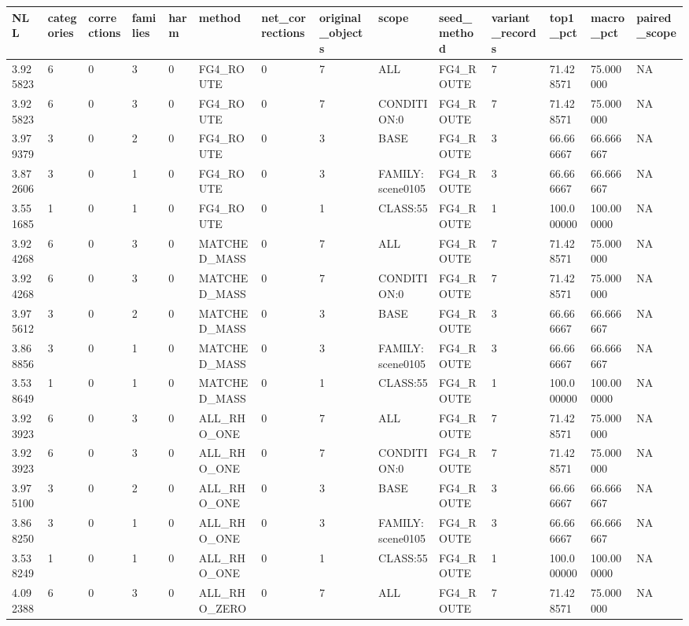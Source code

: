 \begin{tabular}{llllllllllllll}
\toprule
NLL & categories & corrections & families & harm & method & net\_corrections & original\_objects & scope & seed\_method & variant\_records & top1\_pct & macro\_pct & paired\_scope \\
\midrule
3.925823 & 6 & 0 & 3 & 0 & FG4\_ROUTE & 0 & 7 & ALL & FG4\_ROUTE & 7 & 71.428571 & 75.000000 & NA \\
3.925823 & 6 & 0 & 3 & 0 & FG4\_ROUTE & 0 & 7 & CONDITION:0 & FG4\_ROUTE & 7 & 71.428571 & 75.000000 & NA \\
3.979379 & 3 & 0 & 2 & 0 & FG4\_ROUTE & 0 & 3 & BASE & FG4\_ROUTE & 3 & 66.666667 & 66.666667 & NA \\
3.872606 & 3 & 0 & 1 & 0 & FG4\_ROUTE & 0 & 3 & FAMILY:scene0105 & FG4\_ROUTE & 3 & 66.666667 & 66.666667 & NA \\
3.551685 & 1 & 0 & 1 & 0 & FG4\_ROUTE & 0 & 1 & CLASS:55 & FG4\_ROUTE & 1 & 100.000000 & 100.000000 & NA \\
3.924268 & 6 & 0 & 3 & 0 & MATCHED\_MASS & 0 & 7 & ALL & FG4\_ROUTE & 7 & 71.428571 & 75.000000 & NA \\
3.924268 & 6 & 0 & 3 & 0 & MATCHED\_MASS & 0 & 7 & CONDITION:0 & FG4\_ROUTE & 7 & 71.428571 & 75.000000 & NA \\
3.975612 & 3 & 0 & 2 & 0 & MATCHED\_MASS & 0 & 3 & BASE & FG4\_ROUTE & 3 & 66.666667 & 66.666667 & NA \\
3.868856 & 3 & 0 & 1 & 0 & MATCHED\_MASS & 0 & 3 & FAMILY:scene0105 & FG4\_ROUTE & 3 & 66.666667 & 66.666667 & NA \\
3.538649 & 1 & 0 & 1 & 0 & MATCHED\_MASS & 0 & 1 & CLASS:55 & FG4\_ROUTE & 1 & 100.000000 & 100.000000 & NA \\
3.923923 & 6 & 0 & 3 & 0 & ALL\_RHO\_ONE & 0 & 7 & ALL & FG4\_ROUTE & 7 & 71.428571 & 75.000000 & NA \\
3.923923 & 6 & 0 & 3 & 0 & ALL\_RHO\_ONE & 0 & 7 & CONDITION:0 & FG4\_ROUTE & 7 & 71.428571 & 75.000000 & NA \\
3.975100 & 3 & 0 & 2 & 0 & ALL\_RHO\_ONE & 0 & 3 & BASE & FG4\_ROUTE & 3 & 66.666667 & 66.666667 & NA \\
3.868250 & 3 & 0 & 1 & 0 & ALL\_RHO\_ONE & 0 & 3 & FAMILY:scene0105 & FG4\_ROUTE & 3 & 66.666667 & 66.666667 & NA \\
3.538249 & 1 & 0 & 1 & 0 & ALL\_RHO\_ONE & 0 & 1 & CLASS:55 & FG4\_ROUTE & 1 & 100.000000 & 100.000000 & NA \\
4.092388 & 6 & 0 & 3 & 0 & ALL\_RHO\_ZERO & 0 & 7 & ALL & FG4\_ROUTE & 7 & 71.428571 & 75.000000 & NA \\

\end{tabular}
